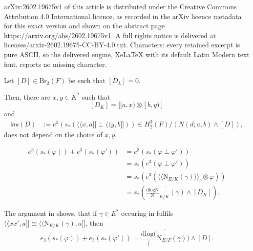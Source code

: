 \documentclass[10pt,a4paper]{amsart}
\newcommand{\BrTwo}{\mathrm{Br}_2}
\newcommand{\bipf}[1]{\langle\!\langle #1\rangle\!\rangle_b}
\newcommand{\dlog}[1]{\frac{\mathrm{dlog}#1}{#1}}
\newcommand{\inv}{\mathsf{inv}}
\newcommand{\norm}{\mathrm{N}}
\newcommand{\qpf}[1]{\langle\!\langle #1]\!]}
\newcommand{\quat}[1]{[#1)}
\begin{document}
arXiv:2602.19675v1 of this article is distributed under the Creative Commons Attribution 4.0 International licence, as recorded in the arXiv licence metadata for this exact version and shown on the abstract page https://arxiv.org/abs/2602.19675v1. A full rights notice is delivered at licenses/arxiv-2602.19675-CC-BY-4.0.txt. Characters: every retained excerpt is pure ASCII, so the delivered engine, XeLaTeX with its default Latin Modern text font, reports no missing character.
\begin{proposition} \label{prop_DK_ExistenceInv}
    Let $[D] \in \BrTwo(F)$ be such that $[D_L] = 0$.

    Then, there are $x, y \in K^\ast$ such that
    \[[D_K] = [\quat{a, x} \otimes \quat{b, y}]\]
    and 
    \begin{align*}
        \inv(D) &:= e^3(s_\ast(\qpf{x, a} \perp \qpf{y, b})) \in H_2^3(F) / (N(d; a, b) \wedge [D]),
    \end{align*}
    does not depend on the choice of $x, y$.
\end{proposition}

    \begin{align} \label{eq_e3TraceSum}
        e^3(s_\ast(\varphi)) + e^3(s_\ast(\varphi')) &= e^3(s_\ast(\varphi \perp \varphi'))\nonumber \\
        &= s_\ast(e^3(\varphi \perp \varphi')) \nonumber\\
        &= s_\ast(e^3(\bipf{\norm_{E / K}(\gamma)} \otimes \varphi)) \nonumber\\
        &= s_\ast\left({\overline{\dlog\norm_{E / K}(\gamma)}} \wedge [D_K] \right).
    \end{align}

\begin{remark} \label{rem_EntriesOfBiquaternion}
	The argument in  shows, that if $\gamma \in E^\ast$ occuring in  fulfils $\qpf{xx', a} \cong \qpf{\norm_{E/K}(\gamma), a}$, then 
	\[e_3(s_\ast(\varphi)) + e_3(s_\ast(\varphi')) = \overline{\dlog(\norm_{E/F}(\gamma))} \wedge [D].\]
\end{remark}
\end{document}
